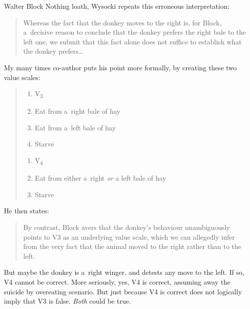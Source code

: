 \begin{artengenv}{Walter Block}
Nothing loath, Wysocki repeats this erroneous interpretation:



\begin{quote}
Whereas the fact that the donkey moves to the right is, for Block, a~decisive reason to conclude that the donkey prefers the right bale to the left one, we submit that this fact alone does not suffice to establish what the donkey prefers…
\end{quote}



My many times co-author puts his point more formally, by creating these two value scales:



\begin{quote}
\begin{enumerate}[label=(\arabic*)]
\item[]\makebox[-1.7em][l]{}V\textsubscript{3}
\item Eat from a~right bale of hay
\item Eat from a~left bale of hay
\item Starve
\end{enumerate}
\vspace{-.7em}
\begin{enumerate}[label=(\arabic*)]
\item[]\makebox[-1.7em][l]{}V\textsubscript{4}
\item Eat from either a~right \textit{or} a left bale of hay
\item Starve
\end{enumerate}
\end{quote}


He then states:



\begin{quote}
By contrast, Block avers that the donkey's behaviour unambiguously points to V3 as an underlying value scale, which we can allegedly infer from the very fact that the animal moved to the right rather than to the left.
\end{quote}



But maybe the donkey is a~right winger, and detests any move to the left. If so, V4 cannot be correct. More seriously, yes, V4 is correct, assuming away the suicide by overeating scenario. But just because V4 is correct does not logically imply that V3 is false. \textit{Both} could be true.




\end{artengenv}
